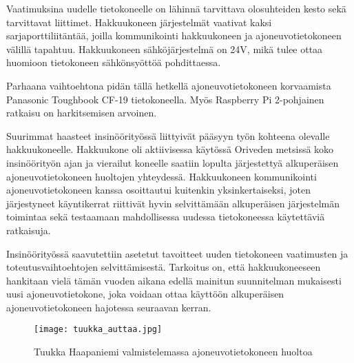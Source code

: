 Vaatimuksina uudelle tietokoneelle on lähinnä tarvittava olosuhteiden kesto sekä tarvittavat liittimet. Hakkuukoneen järjestelmät vaativat kaksi sarjaporttiliitäntää, joilla kommunikointi hakkuukoneen ja ajoneuvotietokoneen välillä tapahtuu. Hakkuukoneen sähköjärjestelmä on 24V, mikä tulee ottaa huomioon tietokoneen sähkönsyöttöä pohdittaessa.

Parhaana vaihtoehtona pidän tällä hetkellä ajoneuvotietokoneen korvaamista Panasonic Toughbook CF-19 tietokoneella. Myös Raspberry Pi 2-pohjainen ratkaisu on harkitsemisen arvoinen.

Suurimmat haasteet insinöörityössä liittyivät pääsyyn työn kohteena olevalle hakkuukoneelle. Hakkuukone oli aktiivisessa käytössä Oriveden metsissä koko insinöörityön ajan ja vierailut koneelle saatiin lopulta järjestettyä alkuperäisen ajoneuvotietokoneen huoltojen yhteydessä. Hakkuukoneen kommunikointi ajoneuvotietokoneen kanssa osoittautui kuitenkin yksinkertaiseksi, joten järjestyneet käyntikerrat riittivät hyvin selvittämään alkuperäisen järjestelmän toimintaa sekä testaamaan mahdollisessa uudessa tietokoneessa käytettäviä ratkaisuja.


Insinöörityössä saavutettiin asetetut tavoitteet uuden tietokoneen vaatimusten ja toteutusvaihtoehtojen selvittämisestä. Tarkoitus on, että hakkuukoneeseen hankitaan vielä tämän vuoden aikana edellä mainitun suunnitelman mukaisesti uusi ajoneuvotietokone, joka voidaan ottaa käyttöön alkuperäisen ajoneuvotietokoneen hajotessa seuraavan kerran.



\begin{figure}[H]
\centering
\texttt{[image: tuukka\_auttaa.jpg]}
\caption{Tuukka Haapaniemi valmistelemassa ajoneuvotietokoneen huoltoa}
\end{figure}
\newpage

